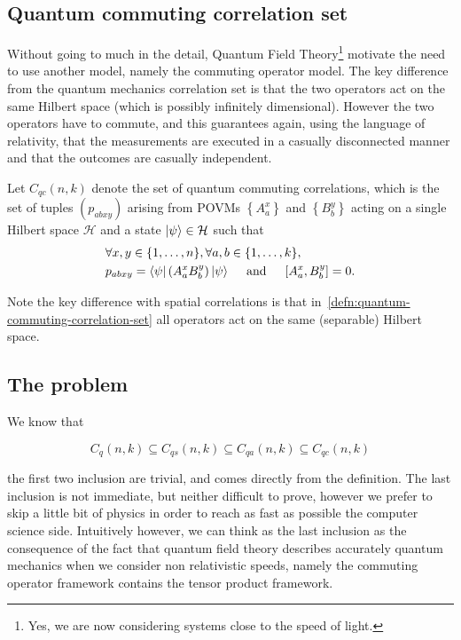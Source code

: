 
\subsection{Quantum commuting correlation set}\label{sec:quantum-commuting-correlation-set}
Without going to much in the detail, Quantum Field Theory\footnote{Yes, we are now considering systems close to the speed of light.} motivate the need to use another model, namely the commuting operator model. The key difference from the quantum mechanics correlation set is that the two operators act on the same Hilbert space (which is possibly infinitely dimensional). However the two operators have to commute, and this guarantees again, using the language of relativity, that the measurements are executed in a casually disconnected manner and that the outcomes are casually independent.


\begin{defn}\label{defn:quantum-commuting-correlation-set}
Let $C_{q c}(n, k)$ denote the set of quantum commuting correlations, which is the set of tuples $\left(p_{a b x y}\right)$ arising from POVMs $\left\{A_{a}^{x}\right\}$ and $\left\{B_{b}^{y}\right\}$ acting on a single Hilbert space $\mathcal{H}$ and a state $\ket{\psi} \in \mathcal{H}$ such that
\begin{equation}
    \begin{split}
&\forall x, y \in\{1, \ldots, n\}, \forall a, b \in\{1, \ldots, k\}, \quad \\
 &p_{a b x y}=\bra{\psi}\left(A_{a}^{x} B_{b}^{y}\right) \ket{\psi} \quad \text { and } \quad\left[A_{a}^{x}, B_{b}^{y}\right]=0 .
    \end{split}
\end{equation}
\end{defn}
Note the key difference with spatial correlations is that in~\ref{defn:quantum-commuting-correlation-set} all operators act on the same (separable) Hilbert space. 

\subsection{The problem}

We know that

\begin{equation}
    C_{q}(n, k) \subseteq C_{q s}(n, k) \subseteq C_{q a}(n, k) \subseteq C_{q c}(n, k)
\end{equation}

the first two inclusion are trivial, and comes directly from the definition. The last inclusion is not immediate, but neither difficult to prove, however we prefer to skip a little bit of physics in order to reach as fast as possible the computer science side. Intuitively however, we can think as the last inclusion as the consequence of the fact that quantum field theory describes accurately quantum mechanics when we consider non relativistic speeds, namely the commuting operator framework contains the tensor product framework.

